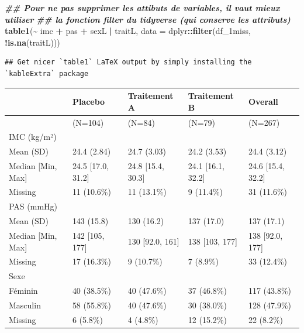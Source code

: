 \documentclass[
]{book}
\newenvironment{Shaded}{\begin{snugshade}}{\end{snugshade}}
\newcommand{\AttributeTok}[1]{\textcolor[rgb]{0.13,0.29,0.53}{#1}}
\newcommand{\DocumentationTok}[1]{\textcolor[rgb]{0.56,0.35,0.01}{\textbf{\textit{#1}}}}
\newcommand{\FunctionTok}[1]{\textcolor[rgb]{0.13,0.29,0.53}{\textbf{#1}}}
\newcommand{\NormalTok}[1]{#1}
\newcommand{\SpecialCharTok}[1]{\textcolor[rgb]{0.81,0.36,0.00}{\textbf{#1}}}
\begin{document}
\begin{Shaded}
\begin{Highlighting}[]
\DocumentationTok{\#\# Pour ne pas supprimer les attibuts de variables, il vaut mieux utiliser}
\DocumentationTok{\#\# la fonction filter du tidyverse (qui conserve les attributs)}
\FunctionTok{table1}\NormalTok{(}\SpecialCharTok{\textasciitilde{}}\NormalTok{ imc }\SpecialCharTok{+}\NormalTok{ pas }\SpecialCharTok{+}\NormalTok{ sexL }\SpecialCharTok{|}\NormalTok{ traitL, }
       \AttributeTok{data =}\NormalTok{ dplyr}\SpecialCharTok{::}\FunctionTok{filter}\NormalTok{(df\_1miss, }\SpecialCharTok{!}\FunctionTok{is.na}\NormalTok{(traitL))) }
\end{Highlighting}
\end{Shaded}

\begin{verbatim}
## Get nicer `table1` LaTeX output by simply installing the `kableExtra` package
\end{verbatim}

\begin{tabular}{lllll}
\toprule
  & Placebo & Traitement A & Traitement B & Overall\\
\midrule
 & (N=104) & (N=84) & (N=79) & (N=267)\\
IMC (kg/m²) &  &  &  & \\
Mean (SD) & 24.4 (2.84) & 24.7 (3.03) & 24.2 (3.53) & 24.4 (3.12)\\
Median [Min, Max] & 24.5 [17.0, 31.2] & 24.8 [15.4, 30.3] & 24.1 [16.1, 32.2] & 24.6 [15.4, 32.2]\\
Missing & 11 (10.6\%) & 11 (13.1\%) & 9 (11.4\%) & 31 (11.6\%)\\
\addlinespace
PAS (mmHg) &  &  &  & \\
Mean (SD) & 143 (15.8) & 130 (16.2) & 137 (17.0) & 137 (17.1)\\
Median [Min, Max] & 142 [105, 177] & 130 [92.0, 161] & 138 [103, 177] & 138 [92.0, 177]\\
Missing & 17 (16.3\%) & 9 (10.7\%) & 7 (8.9\%) & 33 (12.4\%)\\
Sexe &  &  &  & \\
\addlinespace
Féminin & 40 (38.5\%) & 40 (47.6\%) & 37 (46.8\%) & 117 (43.8\%)\\
Masculin & 58 (55.8\%) & 40 (47.6\%) & 30 (38.0\%) & 128 (47.9\%)\\
Missing & 6 (5.8\%) & 4 (4.8\%) & 12 (15.2\%) & 22 (8.2\%)\\
\bottomrule
\end{tabular}
\end{document}
